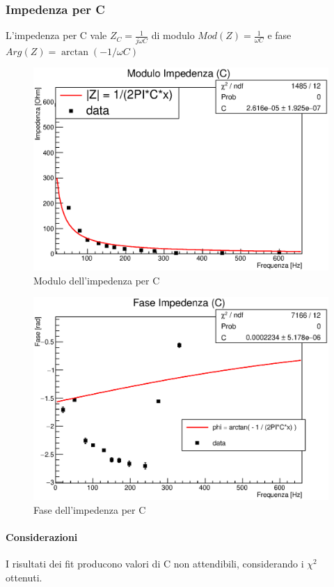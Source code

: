 \subsubsection{Impedenza per C}
L'impedenza per C vale $Z_C = \tfrac{1}{j\omega C}$ di modulo $ Mod(Z) = \tfrac{1}{\omega C}$ e fase $Arg(Z)= \arctan(- 1/ \omega C)$
\begin{figure}[H]
    \centering
    \includegraphics[scale=.7]{Grafici/C2_P2_impedenzaC.eps}
    \caption{Modulo dell'impedenza per C}
    \end{figure}

\begin{figure}[H]
    \includegraphics[scale=.7]{Grafici/C2_P2_impedenzaFaseC.eps}
    \caption{Fase dell'impedenza per C}
\end{figure}
\paragraph{Considerazioni}{I risultati dei fit producono valori di C non attendibili, considerando i $\chi^2$ ottenuti.}

